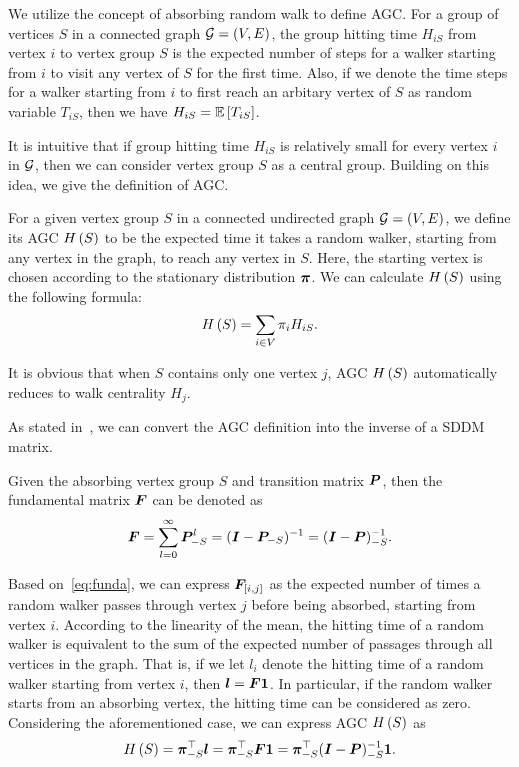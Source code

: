 \documentclass[10pt,journal,compsoc,twocolumn,twoside]{IEEEtran}
\begin{document}
We utilize the concept of absorbing random walk to define AGC.
For a group of vertices \(S\) in a connected graph \(\mathcal{G}=(V,E)\), the group hitting time \(H_{iS}\) from vertex \(i\) to vertex group \(S\) is the expected number of steps for a walker starting from \(i\) to visit any vertex of \(S\) for the first time.
Also, if we denote the time steps for a walker starting from \(i\) to first reach an arbitary vertex of \(S\) as random variable \(T_{iS}\), then we have \(H_{iS}=\mathbb{E}\left[T_{iS}\right]\).

It is intuitive that if group hitting time \(H_{iS}\) is relatively small for every vertex \(i\) in \(\mathcal{G}\), then we can consider vertex group \(S\) as a central group.
Building on this idea, we give the definition of AGC.

\begin{definition}\label{def:manc}
    For a given vertex group \(S\) in a connected undirected graph \(\mathcal{G}=(V,E)\), we define its AGC \(H\left(S\right)\) to be the expected time it takes a random walker, starting from any vertex in the graph, to reach any vertex in \(S\). Here, the starting vertex is chosen according to the stationary distribution \(\boldsymbol{\pi}\). We can calculate \(H\left(S\right)\) using the following formula:
    \begin{equation*}
        H\left(S\right)=\sum_{i\in V}\pi_i H_{iS}.
    \end{equation*}
\end{definition}

It is obvious that when \(S\) contains only one vertex \(j\), AGC \(H\left(S\right)\) automatically reduces to walk centrality \(H_j\).

As stated in~\cite{KeSn76}, we can convert the AGC definition into the inverse of a SDDM matrix.

\begin{fact}
    Given the absorbing vertex group \(S\) and transition matrix \(\boldsymbol{P}\), then the fundamental matrix \(\boldsymbol{F}\) can be denoted as
    \begin{equation}\label{eq:funda}
        \boldsymbol{F}=\sum_{l=0}^\infty\boldsymbol{P}_{-S}^l=(\boldsymbol{I}-\boldsymbol{P}_{-S})^{-1}=(\boldsymbol{I}-\boldsymbol{P})_{-S}^{-1}.
    \end{equation}
\end{fact}

Based on~\eqref{eq:funda}, we can express \(\boldsymbol{F}_{[i,j]}\) as the expected number of times a random walker passes through vertex \(j\) before being absorbed, starting from vertex \(i\).
According to the linearity of the mean, the hitting time of a random walker is equivalent to the sum of the expected number of passages through all vertices in the graph. That is, if we let \(l_i\) denote the hitting time of a random walker starting from vertex \(i\), then \(\boldsymbol{l}=\boldsymbol{F}\boldsymbol{1}\).
In particular, if the random walker starts from an absorbing vertex, the hitting time can be considered as zero.
Considering the aforementioned case, we can express AGC \(H\left(S\right)\) as
\begin{equation*}
    H\left(S\right)=\boldsymbol{\pi}_{-S}^\top\boldsymbol{l}=\boldsymbol{\pi}_{-S}^\top\boldsymbol{F}\boldsymbol{1}=\boldsymbol{\pi}_{-S}^\top(\boldsymbol{I}-\boldsymbol{P})_{-S}^{-1}\boldsymbol{1}.
\end{equation*}
\end{document}
